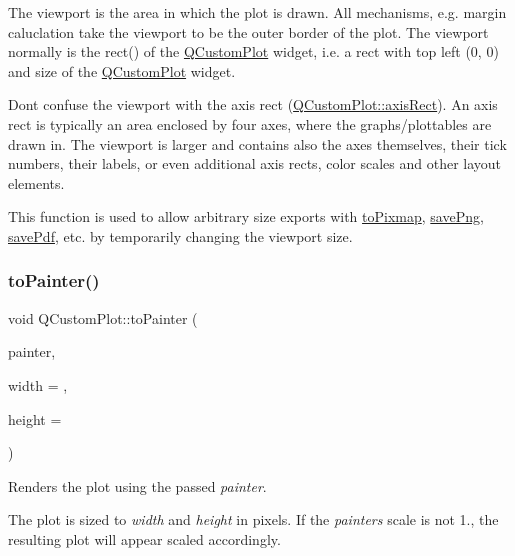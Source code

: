 The viewport is the area in which the plot is drawn. All mechanisms, e.\+g. margin caluclation take the viewport to be the outer border of the plot. The viewport normally is the rect() of the \mbox{\hyperlink{class_q_custom_plot}{Q\+Custom\+Plot}} widget, i.\+e. a rect with top left (0, 0) and size of the \mbox{\hyperlink{class_q_custom_plot}{Q\+Custom\+Plot}} widget.

Don\textquotesingle{}t confuse the viewport with the axis rect (\mbox{\hyperlink{class_q_custom_plot_ae5eefcb5f6ca26689b1fd4f6e25b42f9}{Q\+Custom\+Plot\+::axis\+Rect}}). An axis rect is typically an area enclosed by four axes, where the graphs/plottables are drawn in. The viewport is larger and contains also the axes themselves, their tick numbers, their labels, or even additional axis rects, color scales and other layout elements.

This function is used to allow arbitrary size exports with \mbox{\hyperlink{class_q_custom_plot_aabb974d71ce96c137dc04eb6eab844fe}{to\+Pixmap}}, \mbox{\hyperlink{class_q_custom_plot_ac92cc9256d12f354b40a4be4600b5fb9}{save\+Png}}, \mbox{\hyperlink{class_q_custom_plot_ad5acd34f6b39c3516887d7e54fec2412}{save\+Pdf}}, etc. by temporarily changing the viewport size. \mbox{\label{class_q_custom_plot_a1be68d5c0f1e086d6374d1340a193fb9}} 
\subsubsection{\texorpdfstring{to\+Painter()}{toPainter()}}
{\footnotesize\ttfamily void Q\+Custom\+Plot\+::to\+Painter (\begin{DoxyParamCaption}\item[{\mbox{\hyperlink{class_q_c_p_painter}{Q\+C\+P\+Painter}} $\ast$}]{painter,  }\item[{int}]{width = {},  }\item[{int}]{height = {} }\end{DoxyParamCaption})}

Renders the plot using the passed {\itshape painter}.

The plot is sized to {\itshape width} and {\itshape height} in pixels. If the {\itshape painter\textquotesingle{}s} scale is not 1., the resulting plot will appear scaled accordingly.

